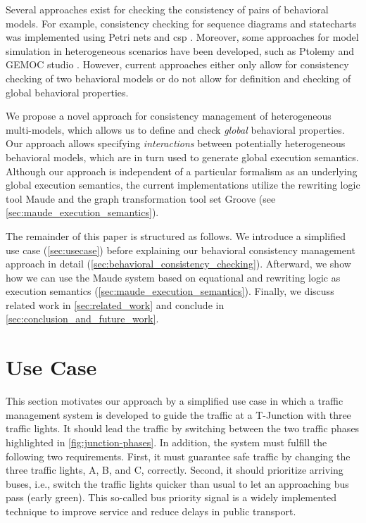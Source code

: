 \documentclass{jot}
\begin{document}
Several approaches exist for checking the consistency of pairs of behavioral models.
For example, consistency checking for sequence diagrams and statecharts was implemented using Petri nets \cite{yaoConsistencyCheckingUML2006} and \gls*{csp} \cite{kusterExplicitBehavioralConsistency2003}.
Moreover, some approaches for model simulation in heterogeneous scenarios have been developed, such as Ptolemy \cite{ekerTamingHeterogeneityPtolemy2003, leeDisciplinedHeterogeneousModeling2010} and GEMOC studio \cite{deantoniModelingBehavioralSemantics2016, varalarsenBCoolBehavioralCoordination2016}.
However, current approaches either only allow for consistency checking of two behavioral models or do not allow for definition and checking of global behavioral properties.

We propose a novel approach for consistency management of heterogeneous multi-models, which allows us to define and check \emph{global} behavioral properties.
Our approach allows specifying \emph{interactions} between potentially heterogeneous behavioral models, which are in turn used to generate global execution semantics.
Although our approach is independent of a particular formalism as an underlying global execution semantics, the current implementations utilize the rewriting logic tool Maude and the graph transformation tool set Groove (see \autoref{sec:maude_execution_semantics}).

The remainder of this paper is structured as follows.
We introduce a simplified use case (\autoref{sec:usecase}) before explaining our behavioral consistency management approach in detail (\autoref{sec:behavioral_consistency_checking}).
Afterward, we show how we can use the Maude system based on equational and rewriting logic as execution semantics (\autoref{sec:maude_execution_semantics}).
Finally, we discuss related work in \autoref{sec:related_work} and conclude in \autoref{sec:conclusion_and_future_work}.

\section{Use Case} \label{sec:usecase}
This section motivates our approach by a simplified use case in which a traffic management system is developed to guide the traffic at a T-Junction with three traffic lights.
It should lead the traffic by switching between the two traffic phases highlighted in \autoref{fig:junction-phases}.
In addition, the system must fulfill the following two requirements.
First, it must guarantee safe traffic by changing the three traffic lights, A, B, and C, correctly.
Second, it should prioritize arriving buses, i.e., switch the traffic lights quicker than usual to let an approaching bus pass (early green).
This so-called bus priority signal is a widely implemented technique to improve service and reduce delays in public transport.
\end{document}
